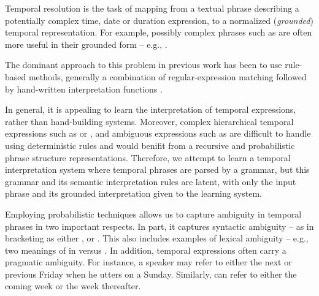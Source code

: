 
Temporal resolution is the task of mapping from a textual phrase describing
	a potentially complex time, date or duration expression, to a normalized
	(\textit{grounded}) temporal representation.
For example, possibly complex phrases such as  are
	often more useful in their grounded form -- e.g., .


The dominant approach to this problem in previous work has been to use
	rule-based methods, generally a combination of regular-expression matching
	followed by hand-written interpretation functions
	\cite{key:2000mani-temporal,key:2003saquete-temporal,key:2004puscasu-temporal,key:2010grover-temporal,key:2010uzzaman-temporal,key:2010kolomiyets-temporal,key:2010strotgen-temporal}.

In general, it is appealing to learn the interpretation of temporal expressions,
	rather than hand-building systems.
Moreover, complex hierarchical temporal expressions such as 
	 or ,
	and ambiguous expressions such as  are difficult to
	handle using deterministic rules and would benifit from a
	recursive and probabilistic phrase structure representations.
Therefore, we attempt to learn
	a temporal interpretation system where temporal phrases are parsed by
	a grammar, but this grammar and its semantic interpretation rules are
	latent, with only the input phrase and its grounded interpretation given
	to the learning system.

Employing probabilistic techniques allows us to capture ambiguity in temporal 
	phrases in two important respects.
In part, it captures syntactic ambiguity -- as in  bracketing as either , or
	.
This also includes examples of lexical ambiguity -- e.g., two
	meanings of  in  versus .
In addition, temporal expressions often carry a pragmatic ambiguity.
For instance, a speaker may refer to either the next or previous Friday
	when he utters  on a Sunday.
Similarly,  can refer to either the coming week or the week
	thereafter.

